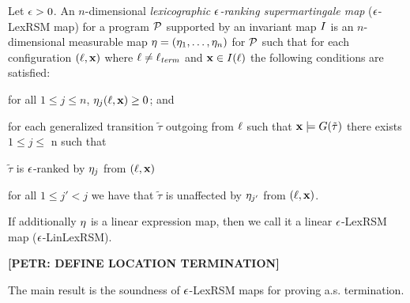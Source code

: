 \begin{definition}
Let $\epsilon>0$. An $n$-dimensional \emph{lexicographic $\epsilon$-ranking supermartingale map} ($\epsilon$-LexRSM map) for a program $\mathcal{P}$ supported by an invariant map $I$ is an $n$-dimensional measurable map $\mathbf{\eta}=(\eta_1,\dots,\eta_n)$ for $\mathcal{P}$ such that for each configuration $(\ell,\mathbf{x})$ where $\ell\neq \ell_{\mathit{term}}$ and $\mathbf{x}\in I(\ell)$ the following conditions are satisfied:
 \begin{compactitem}
 	\item
 	for all $1\leq j \leq n$, $\eta_j(\ell,\mathbf{x})\geq 0$; and
 	\item 
 	for each generalized transition $\tilde{\tau}$ outgoing from $\ell$ such that $\mathbf{x}\models G(\tilde\tau)$ there 
 	exists $1\leq j 
 	\leq$ n such that
 	\begin{compactitem}
 	\item
 	$\tilde{\tau}$ is $\epsilon$-ranked by $\eta_j$ from $(\ell,\mathbf{x})$
 	\item
 	for all $1\leq j'<j$ we have that $\tilde{\tau}$ is unaffected by 
 	$\eta_{j'}$ from $(\ell,\mathbf{x})$.
 	\end{compactitem}
 \end{compactitem}
If additionally $\eta$ is a linear expression map, then we call it a linear $\epsilon$-LexRSM map ($\epsilon$-LinLexRSM).
\end{definition}

\textbf{[PETR: DEFINE LOCATION TERMINATION]}

The main result is the soundness of $\epsilon$-LexRSM maps for proving a.s. 
termination.

